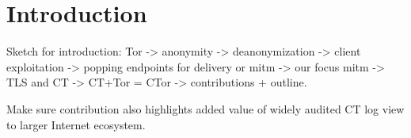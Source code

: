\section{Introduction} \label{sec:introduction}

Sketch for introduction: Tor -> anonymity -> deanonymization -> client
exploitation -> popping endpoints for delivery or mitm -> our focus mitm -> TLS
and CT -> CT+Tor = CTor -> contributions + outline. 

Make sure contribution also highlights added value of widely audited CT log view
to larger Internet ecosystem.